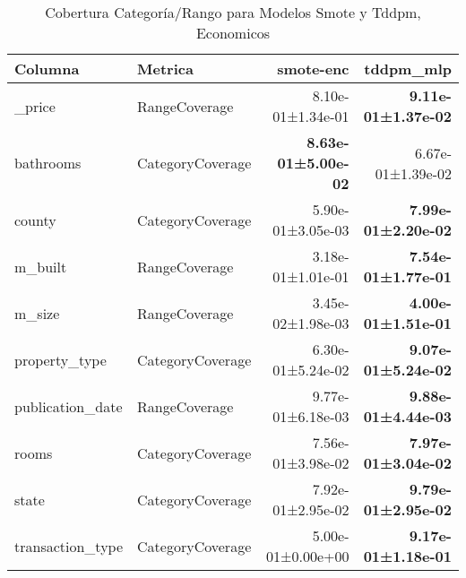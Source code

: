 \begin{table}[H]
\centering
\caption{Cobertura Categoría/Rango para Modelos Smote y Tddpm, Economicos}
\label{table-coverage-economicos-b}
\begin{tabular}{|l|l|r|r|}
\hline
\rowcolor[gray]{0.8}
Columna & Metrica & smote-enc & tddpm\_mlp \\
\hline \_price & RangeCoverage & 8.10e-01±1.34e-01 & \bfseries 9.11e-01±1.37e-02 \\
\hline bathrooms & CategoryCoverage & \bfseries 8.63e-01±5.00e-02 & 6.67e-01±1.39e-02 \\
\hline county & CategoryCoverage & 5.90e-01±3.05e-03 & \bfseries 7.99e-01±2.20e-02 \\
\hline m\_built & RangeCoverage & 3.18e-01±1.01e-01 & \bfseries 7.54e-01±1.77e-01 \\
\hline m\_size & RangeCoverage & \cellcolor[rgb]{0.9, 0.54, 0.52} 3.45e-02±1.98e-03 & \bfseries \cellcolor[rgb]{0.9, 0.54, 0.52} 4.00e-01±1.51e-01 \\
\hline property\_type & CategoryCoverage & 6.30e-01±5.24e-02 & \bfseries 9.07e-01±5.24e-02 \\
\hline publication\_date & RangeCoverage & 9.77e-01±6.18e-03 & \bfseries 9.88e-01±4.44e-03 \\
\hline rooms & CategoryCoverage & 7.56e-01±3.98e-02 & \bfseries 7.97e-01±3.04e-02 \\
\hline state & CategoryCoverage & 7.92e-01±2.95e-02 & \bfseries 9.79e-01±2.95e-02 \\
\hline transaction\_type & CategoryCoverage & 5.00e-01±0.00e+00 & \bfseries 9.17e-01±1.18e-01 \\
\hline
\end{tabular}
\end{table}
